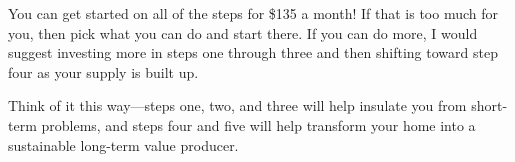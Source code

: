 You can get started on all of the steps for \$135 a
month! If that is too
much for you, then pick what you can do and start there. If you can do
more, I would suggest investing more in steps one through three and
then shifting toward step four as your supply is built up.

Think of it this way---steps one, two, and three will help insulate you
from short-term problems, and steps four and five will help transform
your home into a sustainable long-term value producer.

